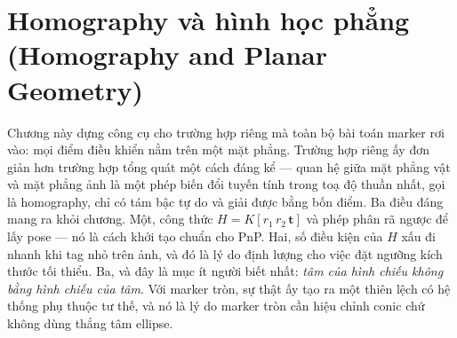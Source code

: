 \documentclass[../../marker.tex]{subfiles}
\begin{document}
\chapter{Homography và hình học phẳng (Homography and Planar Geometry)}

\begin{tomtat}
Chương này dựng công cụ cho trường hợp riêng mà toàn bộ bài toán marker rơi vào: mọi điểm điều khiển nằm trên một mặt phẳng. Trường hợp riêng ấy đơn giản hơn trường hợp tổng quát một cách đáng kể --- quan hệ giữa mặt phẳng vật và mặt phẳng ảnh là một phép biến đổi tuyến tính trong toạ độ thuần nhất, gọi là homography, chỉ có tám bậc tự do và giải được bằng bốn điểm. Ba điều đáng mang ra khỏi chương. Một, công thức \(H = K[r_1\,r_2\,\mathbf{t}]\) và phép phân rã ngược để lấy pose --- nó là cách khởi tạo chuẩn cho PnP. Hai, số điều kiện của \(H\) xấu đi nhanh khi tag nhỏ trên ảnh, và đó là lý do định lượng cho việc đặt ngưỡng kích thước tối thiểu. Ba, và đây là mục ít người biết nhất: \emph{tâm của hình chiếu không bằng hình chiếu của tâm}. Với marker tròn, sự thật ấy tạo ra một thiên lệch có hệ thống phụ thuộc tư thế, và nó là lý do marker tròn cần hiệu chỉnh conic chứ không dùng thẳng tâm ellipse.
\end{tomtat}
\end{document}
